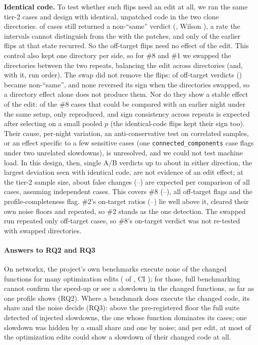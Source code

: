 \textbf{Identical code.} To test whether such flips need an edit at all, we ran the same tier-2 cases and design with identical, unpatched code in the two clone directories.
\DirAANonSame{} of \DirAATotal{} cases still returned a non-``same'' verdict (\DirAAPct\pct, Wilson \ci{\DirAALo}{\DirAAHi}), a rate the intervals cannot distinguish from the \TwoFlipPct\pct{} with the patches, and only \DirAARecur{} of the \DirAARecurN{} earlier flips at that state recurred.
So the off-target flips need no effect of the edit.
This control also kept one directory per side, so for \#8 and \#1 we swapped the directories between the two repeats, balancing the edit across directories (and, with it, run order).
The swap did not remove the flips: \SwapFlips{} of \SwapTotal{} off-target verdicts (\SwapPct\pct) became non-``same'', and none reversed its sign when the directories swapped, so a directory effect alone does not produce them.
Nor do they show a stable effect of the edit: of the \CrossNightN{} \#8 cases that could be compared with an earlier night under the same setup, only \CrossNightAgree{} reproduced, and sign consistency across repeats is expected after selecting on a small pooled $p$ (the identical-code flips kept their sign too).
Their cause, per-night variation, an anti-conservative test on correlated samples, or an effect specific to a few sensitive cases (one \texttt{connected\_components} case flags under two unrelated slowdowns), is unresolved, and we could not test machine load.
In this design, then, single A/B verdicts up to about \DirAAMaxDev\x{} in either direction, the largest deviation seen with identical code, are not evidence of an edit effect; at the tier-2 sample size, about \DirAAFalsePerComp{} false changes (\DirAAFalseLo--\DirAAFalseHi) are expected per comparison of all \NxBenchCases{} cases, assuming independent cases.
This covers \#8 (\SlowEightRatio--\RepEightRatio\x), all off-target flags and the profile-completeness flag.
\#2's on-target ratios (\RepTwoLo--\RepTwoHi\x) lie well above it, cleared their own noise floors and repeated, so \#2 stands as the one detection.
The swapped run repeated only off-target cases, so \#8's on-target verdict was not re-tested with swapped directories.

\paragraph*{Answers to RQ2 and RQ3}
On networkx, the project's own benchmarks execute none of the changed functions for many optimization edits (\BOneAgentUnreached{} of \NxAgentOpt{}, CI \ci{\BOneAgentLo}{\BOneAgentHi}); for those, full benchmarking cannot confirm the speed-up or see a slowdown in the changed functions, as far as one profile shows (RQ2).
Where a benchmark does execute the changed code, its share and the noise decide (RQ3): above the pre-registered floor the full suite detected \FloorDetect{} of \NumSlowdowns{} injected slowdowns, the one whose function dominates its cases; one slowdown was hidden by a small share and one by noise; and per edit, at most \EditsClearMid{} of the \NxAgentOpt{} optimization edits could show a \PowFactorMid\x{} slowdown of their changed code at all.
